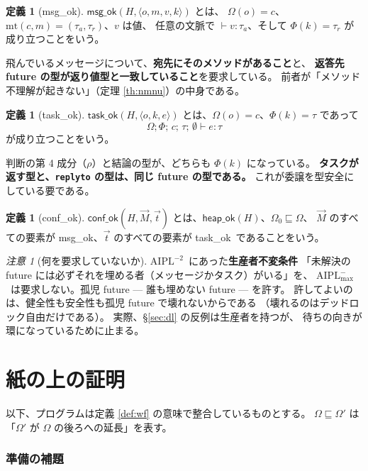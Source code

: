\documentclass[11pt,a4paper]{ltjsarticle}
\theoremstyle{definition}
\newtheorem{definition}[theorem]{定義}
\theoremstyle{remark}
\newtheorem{remark}[theorem]{注意}
\newcommand{\Om}{\Omega}
\newcommand{\Ph}{\Phi}
\newcommand{\mtab}{\mathrm{mt}}
\newcommand{\heapok}{\textsf{heap\_ok}}
\newcommand{\msgok}{\textsf{msg\_ok}}
\newcommand{\taskok}{\textsf{task\_ok}}
\newcommand{\confok}{\textsf{conf\_ok}}
\newcommand{\Amax}{\ensuremath{\mathrm{AIPL}^{-}_{\max}}}
\newcommand{\Atwo}{\ensuremath{\mathrm{AIPL}^{-2}}}
\begin{document}
\begin{definition}[\msgok]
$\msgok(H, \langle o,m,v,k\rangle)$ とは、
$\Om(o) = c$、$\mtab(c,m) = (\tau_a,\tau_r)$、$v$ は値、
任意の文脈で $\vdash v : \tau_a$、そして $\Ph(k) = \tau_r$ が成り立つことをいう。
\end{definition}

飛んでいるメッセージについて、\textbf{宛先にそのメソッドがあること}と、
\textbf{返答先 future の型が返り値型と一致していること}を要求している。
前者が「メソッド不理解が起きない」（定理 \ref{th:nmnu}）の中身である。

\begin{definition}[\taskok]
$\taskok(H, \langle o,k,e\rangle)$ とは、$\Om(o) = c$、$\Ph(k) = \tau$ であって
\[
  \Om;\Ph;\,c;\,\tau;\,\emptyset \vdash e : \tau
\]
が成り立つことをいう。
\end{definition}

判断の第 4 成分（$\rho$）と結論の型が、どちらも $\Ph(k)$ になっている。
\textbf{タスクが返す型と、\texttt{replyto} の型は、同じ future の型である。}
これが委譲を型安全にしている要である。

\begin{definition}[\confok]
$\confok(H,\vec{M},\vec{t})$ とは、$\heapok(H)$、$\Om_0 \sqsubseteq \Om$、
$\vec{M}$ のすべての要素が \msgok、$\vec{t}$ のすべての要素が \taskok\ であることをいう。
\end{definition}

\begin{remark}[何を要求していないか]
\Atwo\ にあった\textbf{生産者不変条件}
「未解決の future には必ずそれを埋める者（メッセージかタスク）がいる」を、
\Amax\ は要求しない。孤児 future --- 誰も埋めない future --- を許す。
許してよいのは、健全性も安全性も孤児 future で壊れないからである
（壊れるのはデッドロック自由だけである）。
実際、\S\ref{sec:dl} の反例は生産者を持つが、
待ちの向きが環になっているために止まる。
\end{remark}

\part{紙の上の証明}

以下、プログラムは定義 \ref{def:wf} の意味で整合しているものとする。
$\Om \sqsubseteq \Om'$ は「$\Om'$ が $\Om$ の後ろへの延長」を表す。

\section{準備の補題}
\end{document}
